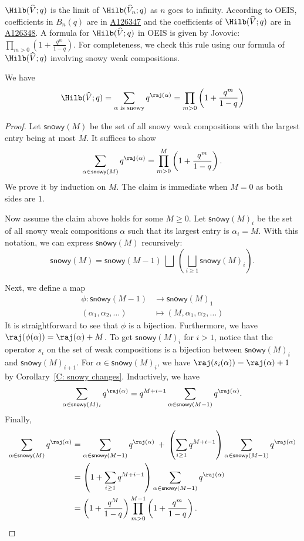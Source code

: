 $\Hilb(\widehat{V};q)$ is the limit of $\Hilb(\widehat{V}_n;q)$
as $n$ goes to infinity. 
According to OEIS, 
coefficients in $B_n(q)$ are in \href{https://oeis.org/A126347}{A126347} and 
the coefficients of $\Hilb(\widehat{V};q)$ are in \href{https://oeis.org/A126348}{A126348}. 
A formula for $\Hilb(\widehat{V};q)$ in OEIS is given by Jovovic: 
$\prod_{m > 0} (1 + \frac{q^m}{1 - q})$.
For completeness, we check this rule using our formula
of $\Hilb(\widehat{V};q)$ involving snowy weak compositions.

\begin{prop}\label{T: F}
We have
$$\Hilb(\widehat{V};q) = \sum_{\alpha \text{ is snowy}} q^{\raj(\alpha)}
= \prod_{m > 0} \left( 1 + \frac{q^m}{1 - q} \right)
$$
\end{prop}

\begin{proof}
Let $\mathsf{snowy}(M)$ be the set of all snowy weak compositions
with the largest entry being at most $M$.
It suffices to show 
$$ \sum_{\alpha \in \mathsf{snowy}(M)} q^{\raj(\alpha)}=\prod_{m  > 0}^M\left(1 + \frac{q^m}{1 - q}\right).$$ 
We prove it by induction on $M$. The claim is immediate when $M = 0$ as both sides are $1$.

Now assume the claim above holds for some $M\geq 0$.
Let $\mathsf{snowy}(M)_i$ be the set of all snowy weak compositions
$\alpha$ such that its largest entry is $\alpha_i = M$.
With this notation, we can express $\mathsf{snowy}(M)$ recursively:
$$\mathsf{snowy}(M) = \mathsf{snowy}(M-1) \:\bigsqcup\: \left( \bigsqcup_{i \geq 1} \mathsf{snowy}(M)_i\right).$$

Next, we define a map
\begin{align*}
    \phi: \mathsf{snowy}(M-1) &\to \mathsf{snowy}(M)_1 \\
    (\alpha_1, \alpha_2, \dots) &\mapsto (M, \alpha_1, \alpha_2, \dots)
\end{align*}
It is straightforward to see that $\phi$ is a bijection.
Furthermore, we have $\raj(\phi(\alpha)) = \raj(\alpha) + M$.
To get $\mathsf{snowy}(M)_i$ for $i>1$, notice that 
the operator $s_i$ on the set of weak compositions is a 
bijection between $\mathsf{snowy}(M)_i$
and $\mathsf{snowy}(M)_{i+1}$.
For $\alpha \in \mathsf{snowy}(M)_i$, we have
$\raj(s_i(\alpha)) = \raj(\alpha) + 1$ 
by Corollary~\ref{C: snowy changes}.
Inductively, we have
$$
\sum_{\alpha \in \mathsf{snowy}(M)_i} q^{\raj(\alpha)}
= q^{M+i - 1}\sum_{\alpha \in \mathsf{snowy}(M-1)} q^{\raj(\alpha)}.
$$
Finally, 
\begin{align*}
\sum_{\alpha \in \mathsf{snowy}(M)} q^{\raj(\alpha)} & =
\sum_{\alpha \in \mathsf{snowy}(M-1)} q^{\raj(\alpha)}
\:+\: \left(\sum_{i \geq 1}q^{M+i-1}\right) \sum_{\alpha \in \mathsf{snowy}(M-1)} q^{\raj(\alpha)}\\
& = 
\left(1 + \sum_{i \geq 1}q^{M+i-1} \right) \sum_{\alpha \in \mathsf{snowy}(M-1)} q^{\raj(\alpha)} \\
& = \left(1+\frac{q^M}{1-q}\right)\prod_{m  > 0}^{M-1}\left(1 + \frac{q^m}{1 - q}\right).
\end{align*}
\end{proof}


